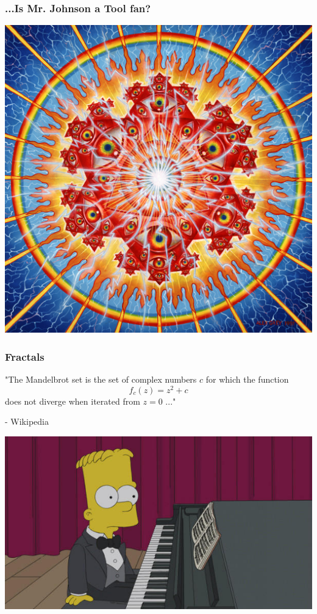 \documentclass{beamer}
\theoremstyle{mystyle}
\begin{document}

\begin{frame}
\frametitle{...Is Mr. Johnson a Tool fan?}
\begin{center}
	\includegraphics[scale=0.17]{lateralus.jpg}
\end{center}

\end{frame}

\begin{frame}
\frametitle{Fractals}

\begin{center}
"The Mandelbrot set is the set of complex numbers $c$ for which the function
\[ f_c(z) = z^2 + c\]
does not diverge when iterated from $z = 0$ ..."
\end{center} 
\hspace{3in}- Wikipedia

\pause 

\begin{center}
	\includegraphics[scale=0.3]{bart}
\end{center}

\end{frame}
\end{document}
